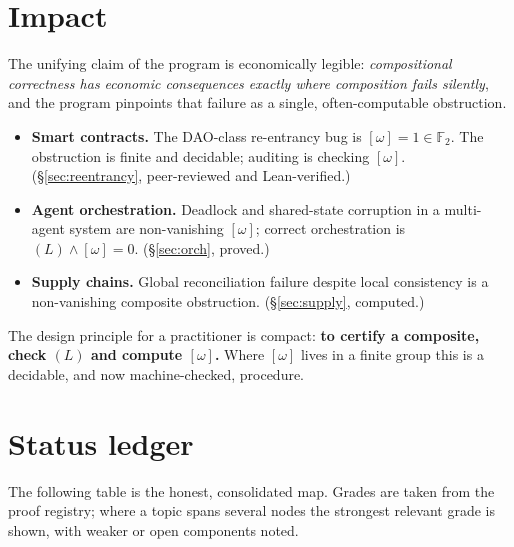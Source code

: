 \documentclass[11pt]{article}
\theoremstyle{plain}
\theoremstyle{definition}
\theoremstyle{remark}
\newcommand{\omegacl}{[\omega]}
\begin{document}
\section{Impact}\label{sec:impact}

The unifying claim of the program is economically legible: \emph{compositional
correctness has economic consequences exactly where composition fails silently}, and the
program pinpoints that failure as a single, often-computable obstruction.

\begin{itemize}[nosep]
  \item \textbf{Smart contracts.} The DAO-class re-entrancy bug is $\omegacl = 1 \in
    \mathbb{F}_2$. The obstruction is finite and decidable; auditing is checking
    $\omegacl$. (\S\ref{sec:reentrancy}, peer-reviewed and Lean-verified.)
  \item \textbf{Agent orchestration.} Deadlock and shared-state corruption in a
    multi-agent system are non-vanishing $\omegacl$; correct orchestration is
    $(L)\wedge\omegacl=0$. (\S\ref{sec:orch}, proved.)
  \item \textbf{Supply chains.} Global reconciliation failure despite local consistency
    is a non-vanishing composite obstruction. (\S\ref{sec:supply}, computed.)
\end{itemize}

The design principle for a practitioner is compact: \textbf{to certify a composite, check
$(L)$ and compute $\omegacl$.} Where $\omegacl$ lives in a finite group this is a
decidable, and now machine-checked, procedure.

\section{Status ledger}\label{sec:status}

The following table is the honest, consolidated map. Grades are taken from the proof
registry; where a topic spans several nodes the strongest relevant grade is shown, with
weaker or open components noted.
\end{document}
